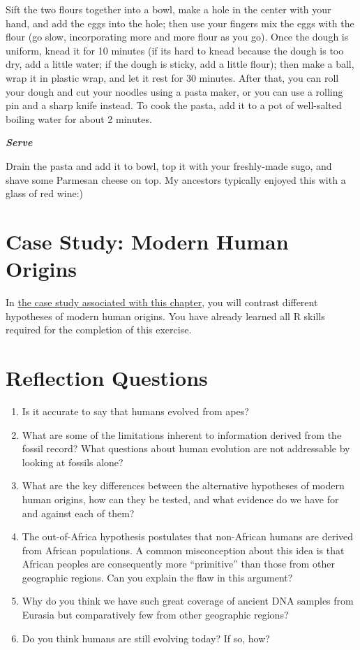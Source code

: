 \documentclass[
]{book}
\begin{document}
Sift the two flours together into a bowl, make a hole in the center with your hand, and add the eggs into the hole; then use your fingers mix the eggs with the flour (go slow, incorporating more and more flour as you go). Once the dough is uniform, knead it for 10 minutes (if its hard to knead because the dough is too dry, add a little water; if the dough is sticky, add a little flour); then make a ball, wrap it in plastic wrap, and let it rest for 30 minutes. After that, you can roll your dough and cut your noodles using a pasta maker, or you can use a rolling pin and a sharp knife instead. To cook the pasta, add it to a pot of well-salted boiling water for about 2 minutes.

\textbf{\emph{Serve}}

Drain the pasta and add it to bowl, top it with your freshly-made sugo, and shave some Parmesan cheese on top. My ancestors typically enjoyed this with a glass of red wine:)

\hypertarget{case-study-modern-human-origins}{%
\section{Case Study: Modern Human Origins}\label{case-study-modern-human-origins}}

In \href{exercises/BIOL520-ex13.zip}{the case study associated with this chapter}, you will contrast different hypotheses of modern human origins. You have already learned all R skills required for the completion of this exercise.

\hypertarget{reflection-questions-13}{%
\section{Reflection Questions}\label{reflection-questions-13}}

\begin{enumerate}
\def\labelenumi{\arabic{enumi}.}
\item
  Is it accurate to say that humans evolved from apes?
\item
  What are some of the limitations inherent to information derived from the fossil record? What questions about human evolution are not addressable by looking at fossils alone?
\item
  What are the key differences between the alternative hypotheses of modern human origins, how can they be tested, and what evidence do we have for and against each of them?
\item
  The out-of-Africa hypothesis postulates that non-African humans are derived from African populations. A common misconception about this idea is that African peoples are consequently more ``primitive'' than those from other geographic regions. Can you explain the flaw in this argument?
\item
  Why do you think we have such great coverage of ancient DNA samples from Eurasia but comparatively few from other geographic regions?
\item
  Do you think humans are still evolving today? If so, how?
\end{enumerate}
\end{document}
